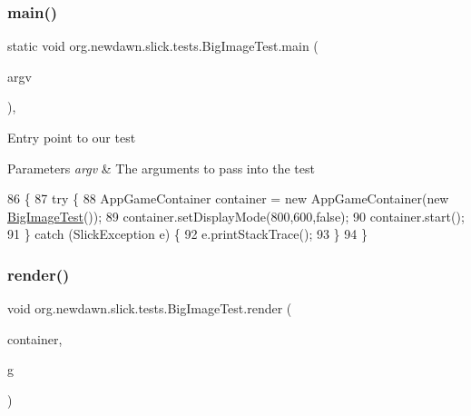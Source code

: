 \subsubsection{\texorpdfstring{main()}{main()}}
{\footnotesize\ttfamily static void org.\+newdawn.\+slick.\+tests.\+Big\+Image\+Test.\+main (\begin{DoxyParamCaption}\item[{String \mbox{[}$\,$\mbox{]}}]{argv }\end{DoxyParamCaption})\hspace{0.3cm}{\ttfamily [inline]}, {\ttfamily [static]}}

Entry point to our test


\begin{DoxyParams}{Parameters}
{\em argv} & The arguments to pass into the test \\
\hline
\end{DoxyParams}

\begin{DoxyCode}
86                                            \{
87         \textcolor{keywordflow}{try} \{
88             AppGameContainer container = \textcolor{keyword}{new} AppGameContainer(\textcolor{keyword}{new} \mbox{\hyperlink{classorg_1_1newdawn_1_1slick_1_1tests_1_1_big_image_test_a60fd75d50b3195c154df6337a25d9155}{BigImageTest}}());
89             container.setDisplayMode(800,600,\textcolor{keyword}{false});
90             container.start();
91         \} \textcolor{keywordflow}{catch} (SlickException e) \{
92             e.printStackTrace();
93         \}
94     \}
\end{DoxyCode}
\mbox{\label{classorg_1_1newdawn_1_1slick_1_1tests_1_1_big_image_test_a661408e4f62d8e035a8fcc9c6ead94cb}} 
\subsubsection{\texorpdfstring{render()}{render()}}
{\footnotesize\ttfamily void org.\+newdawn.\+slick.\+tests.\+Big\+Image\+Test.\+render (\begin{DoxyParamCaption}\item[{\mbox{\hyperlink{classorg_1_1newdawn_1_1slick_1_1_game_container}{Game\+Container}}}]{container,  }\item[{\mbox{\hyperlink{classorg_1_1newdawn_1_1slick_1_1_graphics}{Graphics}}}]{g }\end{DoxyParamCaption})\hspace{0.3cm}{\ttfamily [inline]}}

